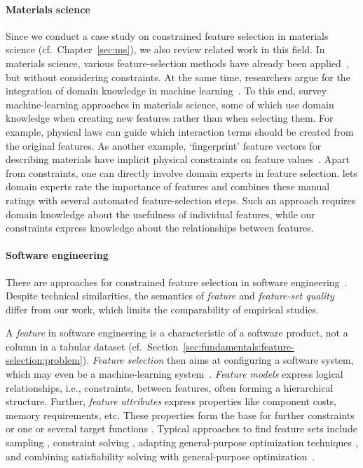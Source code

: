 \paragraph{Materials science}

Since we conduct a case study on constrained feature selection in materials science (cf.~Chapter~\ref{sec:ms}), we also review related work in this field.
In materials science, various feature-selection methods have already been applied~\cite{agrawal2014exploration, imbalzano2018automatic, janet2017resolving}, but without considering constraints.
At the same time, researchers argue for the integration of domain knowledge in machine learning~\cite{mangal2018comparative, wagner2016theory}.
To this end, \cite{childs2019embedding, ramprasad2017machine} survey machine-learning approaches in materials science, some of which use domain knowledge when creating new features rather than when selecting them.
For example, physical laws can guide which interaction terms should be created from the original features.
As another example, `fingerprint' feature vectors for describing materials have implicit physical constraints on feature values~\cite{huan2015accelerated}.
Apart from constraints, one can directly involve domain experts in feature selection.
\cite{liu2020multi} lets domain experts rate the importance of features and combines these manual ratings with several automated feature-selection steps.
Such an approach requires domain knowledge about the usefulness of individual features, while our constraints express knowledge about the relationships between features.

\paragraph{Software engineering}

There are approaches for constrained feature selection in software engineering~\cite{benavides2010automated, galindo2019automated, harman2014search}.
Despite technical similarities, the semantics of \emph{feature} and \emph{feature-set quality} differ from our work, which limits the comparability of empirical studies.

A \emph{feature} in software engineering is a characteristic of a software product, not a column in a tabular dataset (cf.~Section~\ref{sec:fundamentals:feature-selection:problem}).
\emph{Feature selection} then aims at configuring a software system, which may even be a machine-learning system~\cite{aloisio2023democratizing}.
\emph{Feature models} express logical relationships, i.e., constraints, between features, often forming a hierarchical structure.
Further, \emph{feature attributes} express properties like component costs, memory requirements, etc.
These properties form the base for further constraints or one or several target functions \cite{guo2011genetic, henard2015combining, sayyad2013value}.
Typical approaches to find feature sets include sampling \cite{oh2017finding}, constraint solving \cite{white2010automated}, adapting general-purpose optimization techniques \cite{guo2011genetic}, and combining satisfiability solving with general-purpose optimization~\cite{guo2014scaling, guo2019smtibea, henard2015combining}.

